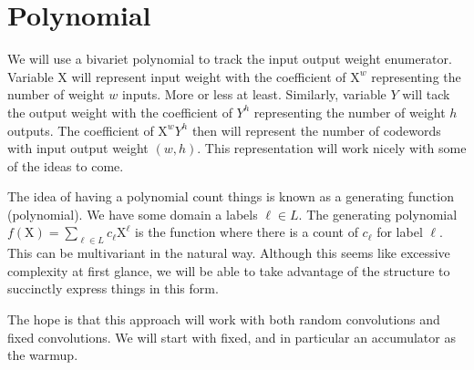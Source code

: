 
\newcommand{\Xr}{\ensuremath{\mathrm{X}}\xspace}
\newcommand{\Yr}{\ensuremath{\mathrm{Y}}\xspace}
\newcommand{\Dr}{\ensuremath{\mathrm{D}}\xspace}

\section{Polynomial}

We will use a bivariet polynomial to track the input output weight enumerator. Variable $\Xr$ will represent input weight with the coefficient of $\Xr^w$ representing the number of weight $w$ inputs. More or less at least. Similarly, variable $Y$ will tack the output weight with the coefficient of $Y^h$ representing the number of weight $h$ outputs. The coefficient of $\Xr^wY^h$ then will represent the number of codewords with input output weight $(w,h)$. This representation will work nicely with some of the ideas to come. 

The idea of having a polynomial count things is known as a generating function (polynomial). We have some domain a labels $\ell\in L$. The generating polynomial $f(\Xr)=\sum_{\ell\in L} c_\ell \Xr^\ell$ is the function where there is a count of $c_\ell$ for label $\ell$. This can be multivariant in the natural way. Although this seems like excessive complexity at first glance, we will be able to take advantage of the structure to succinctly express things in this form. 

The hope is that this approach will work with both random convolutions and fixed convolutions. We will start with fixed, and in particular an accumulator as the warmup.

